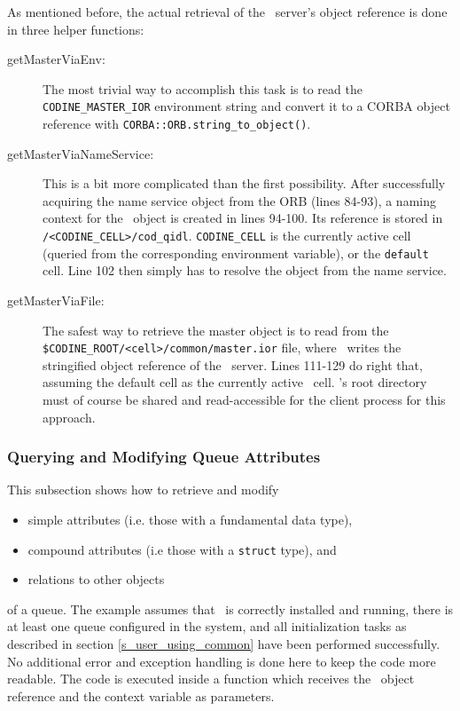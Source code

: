 As mentioned before, the actual retrieval of the \qidl\ server's object
reference is done in three helper functions:

\begin{description}
\item[getMasterViaEnv:] The most trivial way to accomplish this task is to
read the \texttt{CODINE\_MASTER\_IOR} environment string and convert it to a
CORBA object reference with \texttt{CORBA::ORB.string\_to\_object()}.
\item[getMasterViaNameService:] This is a bit more complicated than the first
possibility. After successfully acquiring the name service object from the
ORB (lines 84-93), a naming context for the \qidl\ object is created in lines
94-100. Its reference is stored in \texttt{/<CODINE\_CELL>/cod\_qidl}.
\texttt{CODINE\_CELL} is the currently active cell (queried from the
corresponding environment variable), or the \texttt{default} cell. Line 102
then simply has to resolve the object from the name service.
\item[getMasterViaFile:] The safest way to retrieve the master object is to
read from the \texttt{\$CODINE\_ROOT/<cell>/common/master.ior} file, where
\codine\ writes the stringified object reference of the \qidl\ server. Lines
111-129 do right that, assuming the default cell as the currently active
\codine\ cell. \codine's root directory must of course be shared and 
read-accessible for the client process for this approach.
\end{description}

\subsubsection{Querying and Modifying Queue Attributes}
This subsection shows how to retrieve and modify
\begin{itemize}
\item simple attributes (i.e. those with a fundamental data type),
\item compound attributes (i.e those with a \texttt{struct} type), and
\item relations to other objects
\end{itemize}
of a queue. The example assumes that \codine\ is correctly installed and
running, there is at least one queue configured in the system, and all
initialization tasks as described in section \ref{s_user_using_common} 
have been performed successfully. No additional error and exception handling is
done here to keep the code more readable.
The code is executed inside a function which receives the \master\ object
reference and the context variable as parameters.


